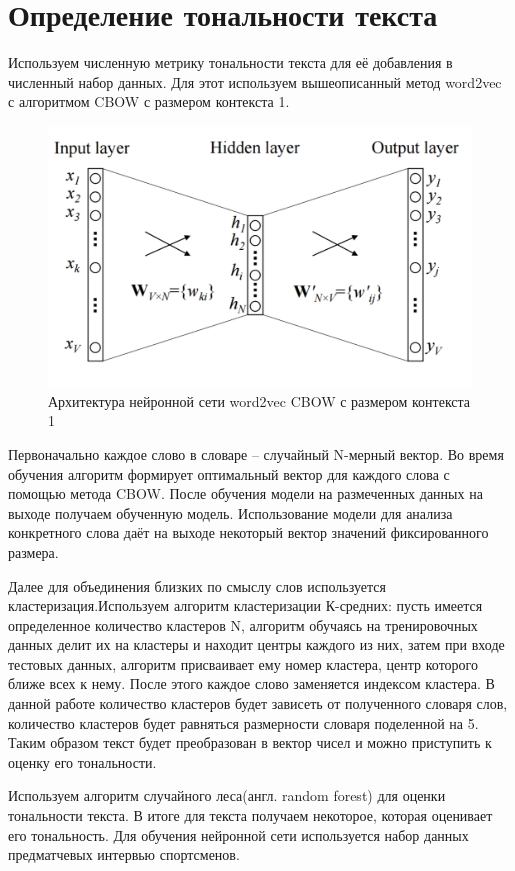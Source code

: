 \section{Определение тональности текста}
Используем численную метрику тональности текста для её добавления в численный набор данных. Для этот используем вышеописанный метод word2vec с алгоритмом CBOW с размером контекста 1.
\begin{figure}[!h]
	\centering
	\includegraphics[scale=0.5]{master_img/cbow_model2.png}
	\caption{Архитектура нейронной сети word2vec CBOW с размером контекста 1}
	\label{fig09}
\end{figure}
 Первоначально каждое слово в словаре – случайный N-мерный вектор. Во время обучения алгоритм формирует оптимальный вектор для каждого слова с помощью метода CBOW. После обучения модели на размеченных данных на выходе получаем обученную модель. Использование модели для анализа конкретного слова даёт на выходе некоторый вектор значений фиксированного размера.
 
 Далее для объединения близких по смыслу слов используется кластеризация.Используем алгоритм кластеризации К-средних: пусть  имеется определенное количество кластеров N, алгоритм обучаясь на тренировочных данных делит их на кластеры и находит центры каждого из них, затем при входе тестовых данных, алгоритм присваивает ему номер кластера, центр которого ближе всех к нему. После этого каждое слово заменяется индексом кластера. В данной работе количество кластеров будет зависеть от полученного словаря слов, количество кластеров будет равняться размерности словаря поделенной на 5\cite{Book31}.
Таким образом текст будет преобразован в вектор чисел и можно приступить к оценку его тональности.

Используем алгоритм случайного леса(англ. random forest) для оценки тональности текста. В итоге для текста получаем некоторое, которая оценивает его тональность.
Для обучения нейронной сети используется набор данных предматчевых интервью спортсменов.

